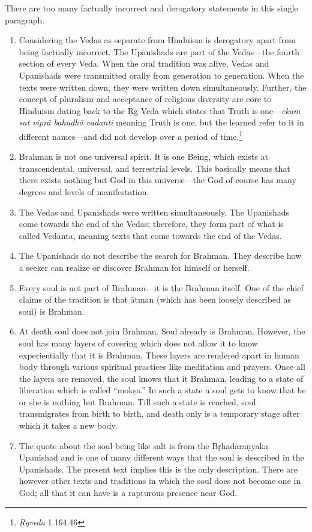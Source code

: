 There are too many factually incorrect and derogatory statements in this single paragraph.
\begin{enumerate}
\itemsep=1pt
\item 
  Considering the Vedas as separate from Hinduism is derogatory apart from being factually incorrect. The Upanishads are part of the Vedas—the fourth section of every Veda. When the oral tradition was alive, Vedas and Upanishads were transmitted orally from generation to generation. When the texts were written down, they were written down simultaneously. Further, the concept of pluralism and acceptance of religious diversity are core to Hinduism dating back to the Ṛg Veda which states that Truth is one—\textit{ekam sat viprā bahudhā vadanti} meaning Truth is one, but the learned refer to it in different names—and did not develop over a period of time.\footnote{\textit{Ṛgveda} 1.164.46}
\item 
Brahman is not one universal spirit. It is one Being, which exists at transcendental, universal, and terrestrial levels. This basically means that there exists nothing but God in this universe—the God of course has many degrees and levels of manifestation. 
\item 
The Vedas and Upanishads were written simultaneously. The Upanishads come towards the end of the Vedas; therefore, they form part of what is called Vedānta, meaning texts that come towards the end of the Vedas. 
\item 
The Upanishads do not describe the search for Brahman. They describe how a seeker can realize or discover Brahman for himself or herself. 
\item 
Every soul is not part of Brahman—it is the Brahman itself. One of the chief claims of the tradition is that ātman (which has been loosely described as soul) is Brahman. 
\item 
At death soul does not join Brahman. Soul already is Brahman. However, the soul has many layers of covering which does not allow it to know experientially that it is Brahman. These layers are rendered apart in human body through various spiritual practices like meditation and prayers. Once all the layers are removed, the soul knows that it Brahman, leading to a state of liberation which is called “mokṣa.” In such a state a soul gets to know that he or she is nothing but Brahman. Till such a state is reached, soul transmigrates from birth to birth, and death only is a temporary stage after which it takes a new body.
\item 
The quote about the soul being like salt is from the Bṛhadāraṇyaka Upanishad and is one of many different ways that the soul is described in the Upanishads. The present text implies this is the only description. There are however other texts and traditions in which the soul does not become one in God; all that it can have is a rapturous presence near God.

\end{enumerate}
